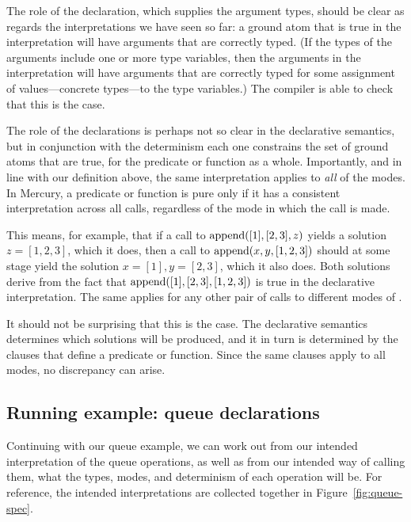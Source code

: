 The role of the  declaration,
which supplies the argument types,
should be clear as regards the interpretations we have seen so far:
a ground atom that is true in the interpretation
will have arguments that are correctly typed.
(If the types of the arguments include one or more type variables,
then the arguments in the interpretation
will have arguments that are correctly typed
for some assignment of values---concrete types---to the type variables.)
The compiler is able to check that this is the case.

The role of the  declarations
is perhaps not so clear in the declarative semantics,
but in conjunction with the determinism
each one constrains the set of ground atoms that are true,
for the predicate or function as a whole.
Importantly,
and in line with our definition above,
the same interpretation applies to \emph{all} of the modes.
In Mercury, a predicate or function is pure
only if it has a consistent interpretation across all calls,
regardless of the mode in which the call is made.

This means, for example,
that if a call to $\operatorname{append}([1],[2,3],z)$
yields a solution $z = [1,2,3]$,
which it does,
then a call to $\operatorname{append}(x,y,[1,2,3])$
should at some stage yield the solution $x = [1], y = [2,3]$,
which it also does.
Both solutions derive from the fact that
$\operatorname{append}([1],[2,3],[1,2,3])$ is true
in the declarative interpretation.
The same applies for any other pair of calls
to different modes of .

It should not be surprising that this is the case.
The declarative semantics determines
which solutions will be produced,
and it in turn is determined by
the clauses that define a predicate or function.
Since the same clauses apply to all modes,
no discrepancy can arise.


\subsection{Running example: queue declarations}
\label{sec:queue-decl}

Continuing with our queue example,
we can work out from our intended interpretation of the queue operations,
as well as from our intended way of calling them,
what the types, modes, and determinism of each operation will be.
For reference,
the intended interpretations are collected together
in Figure~\ref{fig:queue-spec}.

